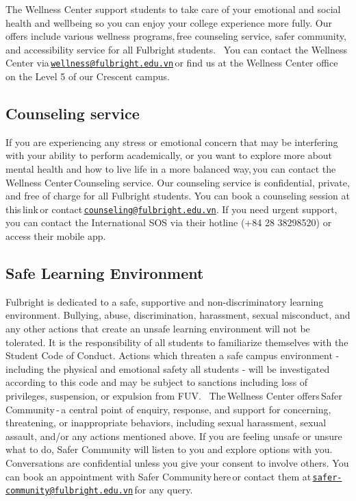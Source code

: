 \documentclass[
]{article}
\begin{document}
The Wellness Center support students to take care of your emotional and social health and wellbeing so you can enjoy your college experience more fully. Our offers include various wellness programs,\,free counseling service, safer community, and accessibility service for all Fulbright students.
\,
You can contact the Wellness Center via\,\href{mailto:wellness@fulbright.edu.vn}{\nolinkurl{wellness@fulbright.edu.vn}}\,or find us at the Wellness Center office on the Level 5 of our Crescent campus.
\,

\subsection*{Counseling service}\label{counseling-service}

If you are experiencing any stress or emotional concern that may be interfering with your ability to perform academically, or you want to explore more about mental health and how to live life in a more balanced way,\,you can contact the Wellness Center\,Counseling service.
Our counseling service is confidential, private, and free of charge for all Fulbright students. You can book a counseling session at this\,link\,or contact\,\href{mailto:counseling@fulbright.edu.vn}{\nolinkurl{counseling@fulbright.edu.vn}}. If you need urgent support, you can contact the International SOS via their hotline (+84 28 38298520) or access their mobile app.

\subsection*{Safe Learning Environment\,}\label{safe-learning-environment}

Fulbright is dedicated to a safe, supportive and non-discriminatory learning environment. Bullying, abuse, discrimination, harassment, sexual misconduct, and any other actions that create an unsafe learning environment will not be tolerated. It is the responsibility of all students to familiarize themselves with the\,Student Code of Conduct. Actions which threaten a safe campus environment - including the physical and emotional safety all students - will be investigated according to this code and may be subject to sanctions including loss of privileges, suspension, or expulsion from FUV.
\,
The\,Wellness Center offers\,Safer Community\,-\,a central point of enquiry, response, and support for concerning, threatening, or inappropriate behaviors, including sexual harassment, sexual assault, and/or any actions mentioned above. If you are feeling unsafe or unsure what to do, Safer Community will listen to you and explore options with you. Conversations are confidential unless you give your consent to involve others. You can book an appointment with Safer Community\,here\,or contact them at\,\href{mailto:safer-community@fulbright.edu.vn}{\nolinkurl{safer-community@fulbright.edu.vn}}\,for any query.
\end{document}
